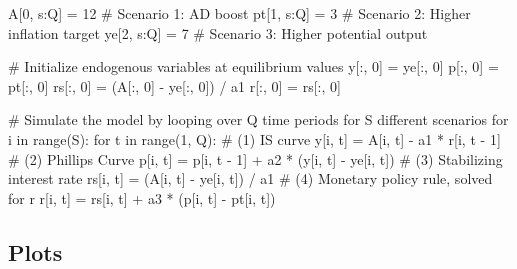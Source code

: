 \documentclass[
  letterpaper,
  DIV=11,
  numbers=noendperiod]{scrreprt}
\newenvironment{Shaded}{\begin{snugshade}}{\end{snugshade}}
\newcommand{\BuiltInTok}[1]{\textcolor[rgb]{0.00,0.23,0.31}{#1}}
\newcommand{\CommentTok}[1]{\textcolor[rgb]{0.37,0.37,0.37}{#1}}
\newcommand{\ControlFlowTok}[1]{\textcolor[rgb]{0.00,0.23,0.31}{#1}}
\newcommand{\DecValTok}[1]{\textcolor[rgb]{0.68,0.00,0.00}{#1}}
\newcommand{\KeywordTok}[1]{\textcolor[rgb]{0.00,0.23,0.31}{#1}}
\newcommand{\NormalTok}[1]{\textcolor[rgb]{0.00,0.23,0.31}{#1}}
\newcommand{\OperatorTok}[1]{\textcolor[rgb]{0.37,0.37,0.37}{#1}}
\begin{document}
\begin{tcolorbox}
\begin{Shaded}
\begin{Highlighting}[]
\NormalTok{A[}\DecValTok{0}\NormalTok{, s:Q] }\OperatorTok{=} \DecValTok{12}  \CommentTok{\# Scenario 1: AD boost}
\NormalTok{pt[}\DecValTok{1}\NormalTok{, s:Q] }\OperatorTok{=} \DecValTok{3}  \CommentTok{\# Scenario 2: Higher inflation target}
\NormalTok{ye[}\DecValTok{2}\NormalTok{, s:Q] }\OperatorTok{=} \DecValTok{7}  \CommentTok{\# Scenario 3: Higher potential output}

\CommentTok{\# Initialize endogenous variables at equilibrium values}
\NormalTok{y[:, }\DecValTok{0}\NormalTok{] }\OperatorTok{=}\NormalTok{ ye[:, }\DecValTok{0}\NormalTok{]}
\NormalTok{p[:, }\DecValTok{0}\NormalTok{] }\OperatorTok{=}\NormalTok{ pt[:, }\DecValTok{0}\NormalTok{]}
\NormalTok{rs[:, }\DecValTok{0}\NormalTok{] }\OperatorTok{=}\NormalTok{ (A[:, }\DecValTok{0}\NormalTok{] }\OperatorTok{{-}}\NormalTok{ ye[:, }\DecValTok{0}\NormalTok{]) }\OperatorTok{/}\NormalTok{ a1}
\NormalTok{r[:, }\DecValTok{0}\NormalTok{] }\OperatorTok{=}\NormalTok{ rs[:, }\DecValTok{0}\NormalTok{]}

\CommentTok{\# Simulate the model by looping over Q time periods for S different scenarios}
\ControlFlowTok{for}\NormalTok{ i }\KeywordTok{in} \BuiltInTok{range}\NormalTok{(S):}
    \ControlFlowTok{for}\NormalTok{ t }\KeywordTok{in} \BuiltInTok{range}\NormalTok{(}\DecValTok{1}\NormalTok{, Q):}
        \CommentTok{\# (1) IS curve}
\NormalTok{        y[i, t] }\OperatorTok{=}\NormalTok{ A[i, t] }\OperatorTok{{-}}\NormalTok{ a1 }\OperatorTok{*}\NormalTok{ r[i, t }\OperatorTok{{-}} \DecValTok{1}\NormalTok{]}
        \CommentTok{\# (2) Phillips Curve}
\NormalTok{        p[i, t] }\OperatorTok{=}\NormalTok{ p[i, t }\OperatorTok{{-}} \DecValTok{1}\NormalTok{] }\OperatorTok{+}\NormalTok{ a2 }\OperatorTok{*}\NormalTok{ (y[i, t] }\OperatorTok{{-}}\NormalTok{ ye[i, t])}
        \CommentTok{\# (3) Stabilizing interest rate}
\NormalTok{        rs[i, t] }\OperatorTok{=}\NormalTok{ (A[i, t] }\OperatorTok{{-}}\NormalTok{ ye[i, t]) }\OperatorTok{/}\NormalTok{ a1}
        \CommentTok{\# (4) Monetary policy rule, solved for r}
\NormalTok{        r[i, t] }\OperatorTok{=}\NormalTok{ rs[i, t] }\OperatorTok{+}\NormalTok{ a3 }\OperatorTok{*}\NormalTok{ (p[i, t] }\OperatorTok{{-}}\NormalTok{ pt[i, t])}
\end{Highlighting}
\end{Shaded}

\end{tcolorbox}

\subsection{Plots}\label{plots-6}
\end{document}

